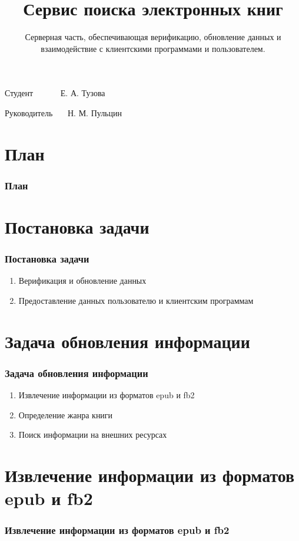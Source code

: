 \documentclass[handout]{beamer}
\title{Сервис поиска электронных книг }
\subtitle{Серверная часть, обеспечивающая верификацию, обновление данных и взаимодействие с клиентскими программами и пользователем.}
\date{}
\begin{document}
\begin{frame}
  \titlepage

  \begin{flushright}
    Студент~~~~~~  Е. А. Тузова
  
    Руководитель~~~  Н. М. Пульцин

  \end{flushright}
\end{frame}

\section*{План}
  \begin{frame}
    \frametitle{План}
    \tableofcontents[pausesections]

  \end{frame}

\section{Постановка задачи}
  \begin{frame}

    \frametitle{Постановка задачи}
    \begin{enumerate}
      \item Верификация и обновление данных
      \item Предоставление данных пользователю и клиентским программам
    \end{enumerate}
  \end{frame}

\section{Задача обновления информации}
  \begin{frame}
    \frametitle{Задача обновления информации}
  
    \begin{enumerate}
      \item Извлечение информации из форматов epub и fb2 
      \item Определение жанра книги
      \item Поиск информации на внешних ресурсах
    \end{enumerate}

  \end{frame}
  
\section{Извлечение информации из форматов epub и fb2 }
  \begin{frame}
    \frametitle{Извлечение информации из форматов epub и fb2 }
  
  \end{frame}
\end{document}
